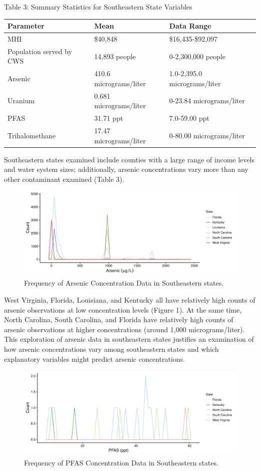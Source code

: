 \documentclass[12pt,]{article}
\begin{document}
Table 3: Summary Statistics for Southeastern State Variables

\begin{longtable}[]{@{}lll@{}}
\toprule
\textbf{Parameter} & \textbf{Mean} & \textbf{Data Range}\tabularnewline
\midrule
\endhead
MHI & \$40,848 & \$16,435-\$92,097\tabularnewline
Population served by CWS & 14,893 people & 0-2,300,000
people\tabularnewline
Arsenic & 410.6 micrograms/liter & 1.0-2,395.0
micrograms/liter\tabularnewline
Uranium & 0.681 micrograms/liter & 0-23.84
micrograms/liter\tabularnewline
PFAS & 31.71 ppt & 7.0-59.00 ppt\tabularnewline
Trihalomethane & 17.47 micrograms/liter & 0-80.00
micrograms/liter\tabularnewline
\bottomrule
\end{longtable}

Southeastern states examined include counties with a large range of
income levels and water system sizes; additionally, arsenic
concentrations vary more than any other contaminant examined (Table 3).

\begin{figure}
\centering
\includegraphics{Project_Template_files/figure-latex/figs-1.pdf}
\caption{Frequency of Arsenic Concentration Data in Southeastern
states.}
\end{figure}

West Virginia, Florida, Louisiana, and Kentucky all have relatively high
counts of arsenic observations at low concentration levels (Figure 1).
At the same time, North Carolina, South Carolina, and Florida have
relatively high counts of arsenic observations at higher concentrations
(around 1,000 micrograms/liter). This exploration of arsenic data in
southeastern states justifies an examination of how arsenic
concentrations vary among southeastern states and which explanatory
variables might predict arsenic concentrations.

\begin{figure}
\centering
\includegraphics{Project_Template_files/figure-latex/figs2-1.pdf}
\caption{Frequency of PFAS Concentration Data in Southeastern states.}
\end{figure}
\end{document}
